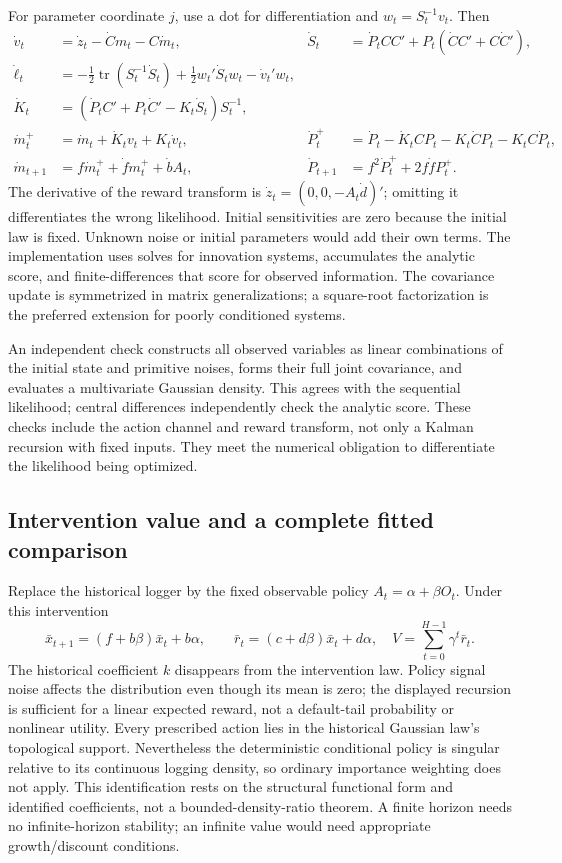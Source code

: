 For parameter coordinate $j$, use a dot for differentiation and
$w_t=S_t^{-1}v_t$. Then
\begin{align}
 \dot v_t&=\dot z_t-\dot C m_t-C\dot m_t, &
 \dot S_t&=\dot P_tCC'+P_t(\dot CC'+C\dot C'),\\
 \dot\ell_t&=-\tfrac12\operatorname{tr}(S_t^{-1}\dot S_t)
       +\tfrac12w_t'\dot S_tw_t-\dot v_t'w_t,\\
 \dot K_t&=(\dot P_tC'+P_t\dot C'-K_t\dot S_t)S_t^{-1},\\
 \dot m_t^+&=\dot m_t+\dot K_tv_t+K_t\dot v_t, &
 \dot P_t^+&=\dot P_t-\dot K_tCP_t-K_t\dot CP_t-K_tC\dot P_t,\\
 \dot m_{t+1}&=f\dot m_t^++\dot f m_t^++\dot b A_t, &
 \dot P_{t+1}&=f^2\dot P_t^++2f\dot f P_t^+.
 \label{s5:gaussian-score}
\end{align}
The derivative of the reward transform is
$\dot z_t=(0,0,-A_t\dot d)'$; omitting it differentiates the wrong
likelihood. Initial sensitivities are zero because the initial law is
fixed. Unknown noise or initial parameters would add their own terms.
The implementation uses solves for innovation systems, accumulates the
analytic score, and finite-differences that score for observed information.
The covariance update is symmetrized in matrix generalizations; a square-root
factorization is the preferred extension for poorly conditioned systems.

An independent check constructs all observed variables as linear combinations
of the initial state and primitive noises, forms their full joint covariance,
and evaluates a multivariate Gaussian density. This agrees with the sequential
likelihood; central differences independently check the analytic score.
These checks include the action channel and reward transform, not only a
Kalman recursion with fixed inputs. They meet the numerical obligation to
differentiate the likelihood being optimized.

\subsection{Intervention value and a complete fitted comparison}
Replace the historical logger by the fixed observable policy
$A_t=\alpha+\beta O_t$. Under this intervention
\[
 \bar x_{t+1}=(f+b\beta)\bar x_t+b\alpha,\qquad
 \bar r_t=(c+d\beta)\bar x_t+d\alpha,
 \quad V=\sum_{t=0}^{H-1}\gamma^t\bar r_t.
\]
The historical coefficient $k$ disappears from the intervention law.
Policy signal noise affects the distribution even though its mean is zero;
the displayed recursion is sufficient for a linear expected reward, not a
default-tail probability or nonlinear utility. Every prescribed action lies
in the historical Gaussian law's topological support. Nevertheless the
deterministic conditional policy is singular relative to its continuous
logging density, so ordinary importance weighting does not apply. This
identification rests on the structural functional form and identified
coefficients, not a bounded-density-ratio theorem. A finite
horizon needs no infinite-horizon stability; an infinite value would need
appropriate growth/discount conditions.

